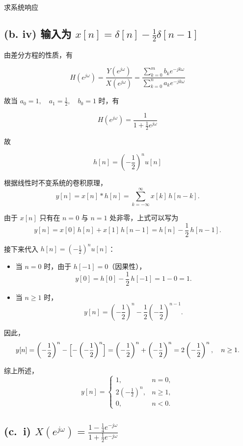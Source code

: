 \documentclass[11pt]{article}
\begin{document}
求系统响应

\subsection{\texorpdfstring{(b. iv) 输入为
\(x[n] = \delta[n] - \frac{1}{2}\delta[n-1]\)}{(b. iv) 输入为 x{[}n{]} = \textbackslash delta{[}n{]} - \textbackslash frac\{1\}\{2\}\textbackslash delta{[}n-1{]}}}\label{b.-iv-ux8f93ux5165ux4e3a-xn-deltan---frac12deltan-1}

由差分方程的性质，有

\[
H(e^{j\omega}) = \frac{Y(e^{j\omega})}{X(e^{j\omega})} = \frac{\sum_{k = 0}^m b_ke^{-jk\omega}}{\sum_{k = 0}^na_ke^{-jk\omega}}
\]

故当 \(a_0 = 1,\quad a_1 = \frac{1}{2}, \quad b_0=1\) 时，有

\[
H(e^{j\omega}) = \frac{1}{1+\frac{1}{2}e^{j\omega}}
\]

故

\[
h[n] = \left(-\frac{1}{2}\right)^nu[n]
\]

根据线性时不变系统的卷积原理， \[
y[n] = x[n] * h[n] = \sum_{k=-\infty}^{\infty} x[k]\,h[n-k].
\]

由于 \(x[n]\) 只有在 \(n=0\) 与 \(n=1\) 处非零，上式可以写为 \[
y[n] = x[0]\,h[n] + x[1]\,h[n-1] = h[n] - \frac{1}{2}\,h[n-1].
\]

接下来代入 \(h[n] = \left(-\frac{1}{2}\right)^n u[n]\)：

\begin{itemize}
\item
  当 \(n=0\) 时，由于 \(h[-1] = 0\)（因果性）， \[
  y[0] = h[0] - \frac{1}{2}\,h[-1] = 1 - 0 = 1.
  \]
\item
  当 \(n \ge 1\) 时， \[
  y[n] = \left(-\frac{1}{2}\right)^n - \frac{1}{2}\left(-\frac{1}{2}\right)^{n-1}.
  \]
\end{itemize}

因此， \[
y[n] = \left(-\frac{1}{2}\right)^n - \Bigl[-\left(-\frac{1}{2}\right)^n\Bigr]
= \left(-\frac{1}{2}\right)^n + \left(-\frac{1}{2}\right)^n
= 2\left(-\frac{1}{2}\right)^n,\quad n\ge1.
\]

综上所述， \[
y[n] =
\begin{cases}
1, & n=0,\\[1mm]
2\left(-\frac{1}{2}\right)^n, & n\ge1,\\[1mm]
0, & n<0.
\end{cases}
\]

\subsection{\texorpdfstring{(c.~i)
\(X(e^{j\omega}) = \frac{1 - \frac{1}{4}e^{-j\omega}}{1 + \frac{1}{2} e^{-j\omega}}\)}{(c.~i) X(e\^{}\{j\textbackslash omega\}) = \textbackslash frac\{1 - \textbackslash frac\{1\}\{4\}e\^{}\{-j\textbackslash omega\}\}\{1 + \textbackslash frac\{1\}\{2\} e\^{}\{-j\textbackslash omega\}\}}}\label{c.-i-xejomega-frac1---frac14e-jomega1-frac12-e-jomega}
\end{document}
